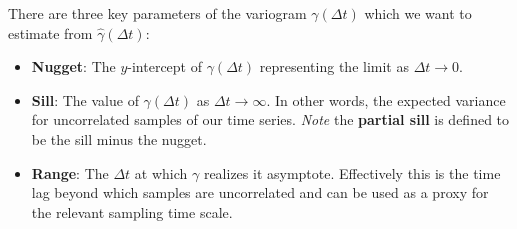There are three key parameters of the variogram $\gamma(\Delta t)$ which we want to estimate from $\hat{\gamma}(\Delta t)$:
\begin{itemize}
\item \textbf{Nugget}: The $y$-intercept of $\gamma(\Delta t)$ representing the limit as $\Delta t \to 0$.
\item \textbf{Sill}: The value of $\gamma(\Delta t)$ as $\Delta t \to \infty$. In other words, the expected variance for uncorrelated samples of our time series. \textit{Note} the \textbf{partial sill} is defined to be the sill minus the nugget.
\item \textbf{Range}: The $\Delta t$ at which $\gamma$ realizes it asymptote. Effectively this is the time lag beyond which samples are uncorrelated and can be used as a proxy for the relevant sampling time scale.
\end{itemize}

